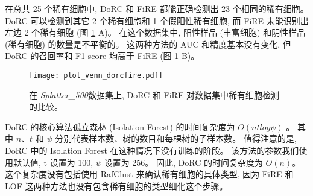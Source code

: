 在总共 25 个稀有细胞中, DoRC 和 FiRE 都能正确检测出 23 个相同的稀有细胞。
DoRC 可以检测到其它 2 个稀有细胞和 1 个假阳性稀有细胞,
而 FiRE 未能识别出左边 2 个稀有细胞 (图 \ref{fig:simulate:venn_auc_f1} A)。
在这个数据集中, 阳性样品 (丰富细胞) 和阴性样品 (稀有细胞) 的数量是不平衡的。
这两种方法的 AUC 和精度基本没有变化,
但 DoRC 的召回率和 F1-score 均高于 FiRE (图 \ref{fig:simulate:venn_auc_f1} B)。
\begin{figure}[!htbp]
    \centering
    \texttt{[image: plot\_venn\_dorcfire.pdf]}
    \caption{
    在 \textit{Splatter\_500}数据集上, DoRC 和 FiRE 对数据集中稀有细胞检测的比较。
    }
    \label{fig:simulate:venn_auc_f1}
\end{figure}

DoRC 的核心算法孤立森林 (Isolation Forest) 的时间复杂度为 $O(ntlog\psi)$ 。
其中 $n$、$t$ 和 $\psi$ 分别代表样本数、树的数目和每棵树的子样本数。
值得注意的是, DoRC 中的 Isolation Forest 在这种情况下没有训练的阶段。
该方法的参数我们使用默认值, t 设置为 100, $\psi$ 设置为 256。
因此, DoRC 的时间复杂度为 $O(n)$。
这个复杂度没有包括使用 RafClust 来确认稀有细胞的具体类型,
因为 FiRE 和 LOF 这两种方法也没有包含稀有细胞的类型细化这个步骤。

